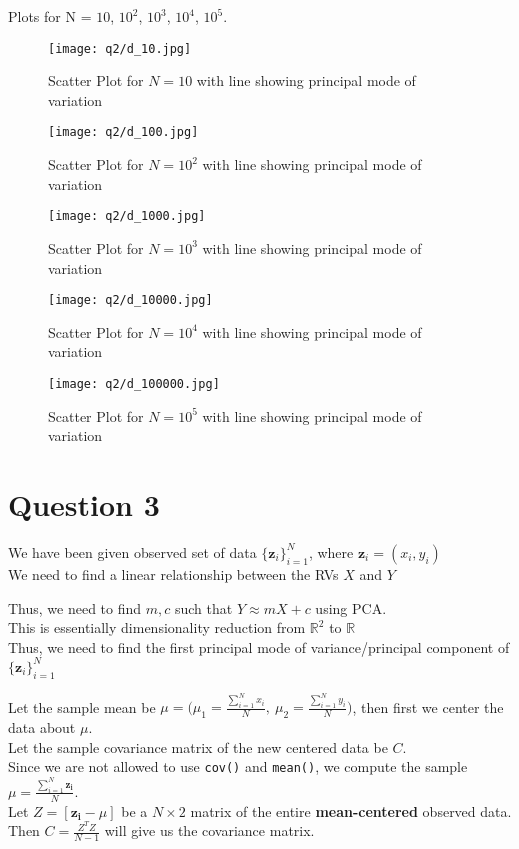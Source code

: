 \documentclass[11pt, fleqn]{article}
\begin{document}
Plots for N = {$10$, $10^2$, $10^3$, $10^4$, $10^5$}.
\begin{figure}[H]
    \centering
    \texttt{[image: q2/d\_10.jpg]}
    \caption{Scatter Plot for $N = 10$ with line showing principal mode of variation}
\end{figure}
\begin{figure}[H]
    \centering
    \texttt{[image: q2/d\_100.jpg]}
    \caption{Scatter Plot for $N = 10^2$ with line showing principal mode of variation}
\end{figure}
\begin{figure}[H]
    \centering
    \texttt{[image: q2/d\_1000.jpg]}
    \caption{Scatter Plot for $N = 10^3$ with line showing principal mode of variation}
\end{figure}
\begin{figure}[H]
    \centering
    \texttt{[image: q2/d\_10000.jpg]}
    \caption{Scatter Plot for $N = 10^4$ with line showing principal mode of variation}
\end{figure}
\begin{figure}[H]
    \centering
    \texttt{[image: q2/d\_100000.jpg]}
    \caption{Scatter Plot for $N = 10^5$ with line showing principal mode of variation}
\end{figure}





\newpage
\section*{Question 3}
\setcounter{equation}{0}
\setcounter{figure}{0}
We have been given observed set of data $\{ \mathbf{z}_i \}_{i=1}^{N}$, where $\mathbf{z}_i = (x_i, y_i)$\\
We need to find a linear relationship between the RVs $X$ and $Y$

\medskip
Thus, we need to find $m, c$ such that $Y \approx mX + c$ using PCA.\\
This is essentially dimensionality reduction from $\mathbb{R}^2$ to $\mathbb{R}$\\
Thus, we need to find the first principal mode of variance/principal component of $\{ \mathbf{z}_i \}_{i=1}^{N}$

\medskip
Let the sample mean be $\mu = \bigg(\mu_1 = \frac{\sum_{i=1}^{N}x_i}{N},\  \mu_2 = \frac{\sum_{i=1}^{N}y_i}{N}\bigg)$, then first we center the data about $\mu$.\\
Let the sample covariance matrix of the new centered data be $C$.\\
Since we are not allowed to use \texttt{cov()} and \texttt{mean()}, we compute the sample $\mu = \frac{\sum_{i=1}^{N}\mathbf{z_i}}{N}$.\\
Let $Z = [\mathbf{z_i} - \mu]$ be a $N\times2$ matrix of the entire \textbf{mean-centered} observed data.\\
Then $C = \frac{Z^T Z}{N-1}$ will give us the covariance matrix.
\end{document}
